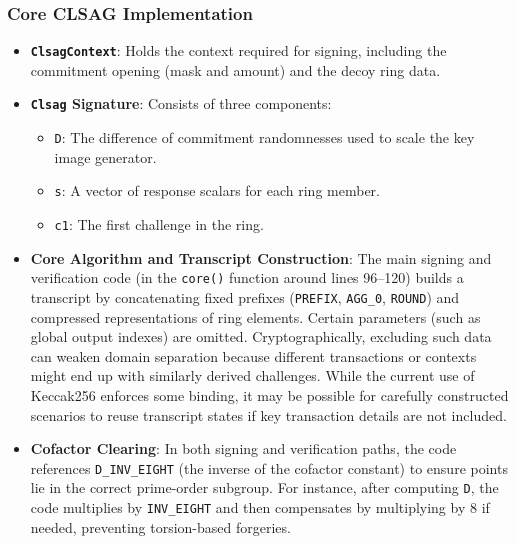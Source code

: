 \documentclass[12pt,a4paper]{article}
\begin{document}
\subsubsection{Core CLSAG Implementation}
\begin{itemize}
    \item \textbf{\texttt{ClsagContext}}: Holds the context required for signing, including the commitment opening (mask and amount) and the decoy ring data.

    \item \textbf{\texttt{Clsag} Signature}: Consists of three components:
    \begin{itemize}
        \item \texttt{D}: The difference of commitment randomnesses used to scale the key image generator.
        \item \texttt{s}: A vector of response scalars for each ring member.
        \item \texttt{c1}: The first challenge in the ring.
    \end{itemize}

    \item \textbf{Core Algorithm and Transcript Construction}:
    The main signing and verification code (in the \texttt{core()} function around lines 96--120) builds a transcript by concatenating fixed prefixes (\texttt{PREFIX}, \texttt{AGG\_0}, \texttt{ROUND}) and compressed representations of ring elements. Certain parameters (such as global output indexes) are omitted. Cryptographically, excluding such data can weaken domain separation because different transactions or contexts might end up with similarly derived challenges. While the current use of Keccak256 enforces some binding, it may be possible for carefully constructed scenarios to reuse transcript states if key transaction details are not included. 

    \item \textbf{Cofactor Clearing}:
    In both signing and verification paths, the code references \texttt{D\_INV\_EIGHT} (the inverse of the cofactor constant) to ensure points lie in the correct prime-order subgroup. For instance, after computing \texttt{D}, the code multiplies by \texttt{INV\_EIGHT} and then compensates by multiplying by 8 if needed, preventing torsion-based forgeries.
\end{itemize}
\end{document}
